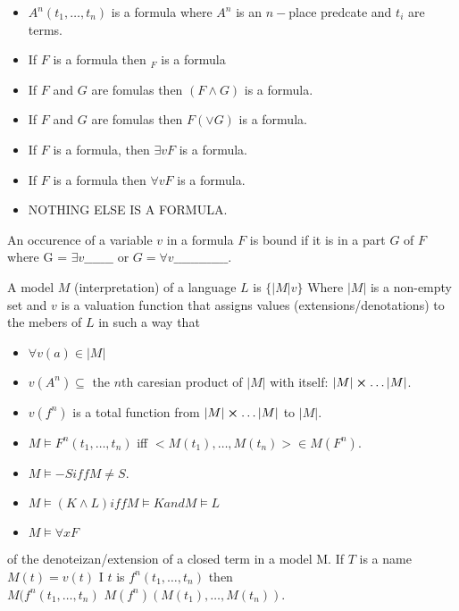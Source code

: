 \begin{definition}[Formula]
\begin{itemize}
\item $A^n(t_1,\dots,t_n)$ is a formula where $A^n$ is an $n-$place predcate and $t_i$ are terms.
\item If $F$ is a formula then $_F$ is a formula
\item If $F$ and $G$ are fomulas then $(F\wedge G)$ is a formula.
\item If $F$ and $G$ are fomulas then $F(\vee G)$ is a formula.
\item If $F$ is a formula, then $\exists vF$ is a formula.
\item If $F$ is a formula then $\forall vF$ is a formula.
\item NOTHING ELSE IS A FORMULA.
\end{itemize}
\end{definition}

\begin{definition}[Bound]
An occurence of a variable $v$ in a formula $F$ is bound if it is in a part $G$ of $F$ where
G = $\exists v \_\_\_\_\_\_\_$ or $G = \forall v \_\_\_\_\_\_\_\_\_\_\_\_\_.$
\end{definition}

\begin{definition}[Model]
A model $M$ (interpretation) of a language $L$ is $\{|M| v\}$ Where $|M|$ is a non-empty set and $v$ is a valuation function that assigns values (extensions/denotations) to the mebers of $L$ in such a way that 
\begin{itemize}
\item $\forall v(a) \in |M|$
\item $v(A^n) \subseteq$ the $n$th caresian product of $|M|$ with itself: $|M|\cross \dots |M|$.
\item $v(f^n)$ is a total function from $|M| \cross \dots |M|$ to $|M|$.
\end{itemize}
\end{definition}


\begin{definition}[Truth]
\begin{itemize}
\item $M \vDash F^n (t_1,\dots,t_n)$ iff $<M(t_1),\dots,M(t_n)> \in M(F^n)$.
\item $M \vDash -S iff M \not = S$.
\item $M \vDash (K \wedge L ) iff M \vDash K and M \vDash L$
\item $M \vDash \forall x F$
\end{itemize}
\end{definition}

\begin{definition}
of the denoteizan/extension of a closed term in a model M.
If $T$ is a name $M(t) = v(t)$
I $t$ is $f^n(t_1,\dots,t_n)$
then \\
$M(f^n(t_1,\dots,t_n)$
$M(f^n)(M(t_1),\dots,M(t_n)).$
\end{definition}

